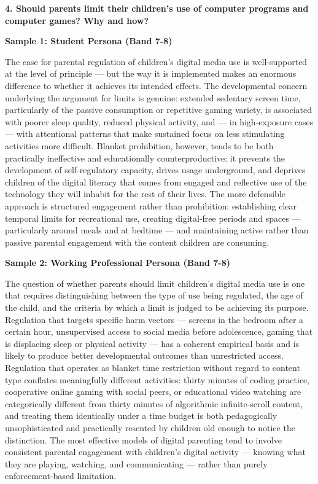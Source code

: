 \separator

\begin{ieltsquestion}
\textbf{4. Should parents limit their children's use of computer programs and computer games? Why and how?}
\end{ieltsquestion}
\textbf{Sample 1: Student Persona (Band 7-8)}

The case for parental regulation of children's digital media use is well-supported at the level of principle — but the way it is implemented makes an enormous difference to whether it achieves its intended effects. The developmental concern underlying the argument for limits is genuine: extended sedentary screen time, particularly of the passive consumption or repetitive gaming variety, is associated with poorer sleep quality, reduced physical activity, and — in high-exposure cases — with attentional patterns that make sustained focus on less stimulating activities more difficult. Blanket prohibition, however, tends to be both practically ineffective and educationally counterproductive: it prevents the development of self-regulatory capacity, drives usage underground, and deprives children of the digital literacy that comes from engaged and reflective use of the technology they will inhabit for the rest of their lives. The more defensible approach is structured engagement rather than prohibition: establishing clear temporal limits for recreational use, creating digital-free periods and spaces — particularly around meals and at bedtime — and maintaining active rather than passive parental engagement with the content children are consuming.

\textbf{Sample 2: Working Professional Persona (Band 7-8)}

The question of whether parents should limit children's digital media use is one that requires distinguishing between the type of use being regulated, the age of the child, and the criteria by which a limit is judged to be achieving its purpose. Regulation that targets specific harm vectors — screens in the bedroom after a certain hour, unsupervised access to social media before adolescence, gaming that is displacing sleep or physical activity — has a coherent empirical basis and is likely to produce better developmental outcomes than unrestricted access. Regulation that operates as blanket time restriction without regard to content type conflates meaningfully different activities: thirty minutes of coding practice, cooperative online gaming with social peers, or educational video watching are categorically different from thirty minutes of algorithmic infinite-scroll content, and treating them identically under a time budget is both pedagogically unsophisticated and practically resented by children old enough to notice the distinction. The most effective models of digital parenting tend to involve consistent parental engagement with children's digital activity — knowing what they are playing, watching, and communicating — rather than purely enforcement-based limitation.

